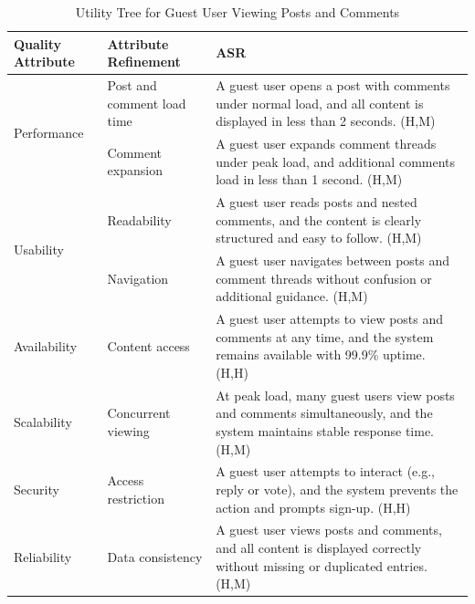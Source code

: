 \documentclass{article}
\begin{document}
\begin{table}[H]
    \centering
    \caption{Utility Tree for Guest User Viewing Posts and Comments}
    \begin{tabular}{|p{3cm}|p{4cm}|p{7cm}|}
        \hline
        \textbf{Quality Attribute} & \textbf{Attribute Refinement}                                                                                               & \textbf{ASR} \\
        \hline

        \multirow{2}{*}{Performance}
                                   & Post and comment load time
                                   & A guest user opens a post with comments under normal load, and all content is displayed in less than 2 seconds. (H,M)                      \\
        \cline{2-3}
                                   & Comment expansion
                                   & A guest user expands comment threads under peak load, and additional comments load in less than 1 second. (H,M)                            \\
        \hline

        \multirow{2}{*}{Usability}
                                   & Readability
                                   & A guest user reads posts and nested comments, and the content is clearly structured and easy to follow. (H,M)                              \\
        \cline{2-3}
                                   & Navigation
                                   & A guest user navigates between posts and comment threads without confusion or additional guidance. (H,M)                                   \\
        \hline

        Availability
                                   & Content access
                                   & A guest user attempts to view posts and comments at any time, and the system remains available with 99.9\% uptime. (H,H)                   \\
        \hline

        Scalability
                                   & Concurrent viewing
                                   & At peak load, many guest users view posts and comments simultaneously, and the system maintains stable response time. (H,M)                \\
        \hline

        Security
                                   & Access restriction
                                   & A guest user attempts to interact (e.g., reply or vote), and the system prevents the action and prompts sign-up. (H,H)                     \\
        \hline

        Reliability
                                   & Data consistency
                                   & A guest user views posts and comments, and all content is displayed correctly without missing or duplicated entries. (H,M)                 \\
        \hline
    \end{tabular}
\end{table}
\end{document}
